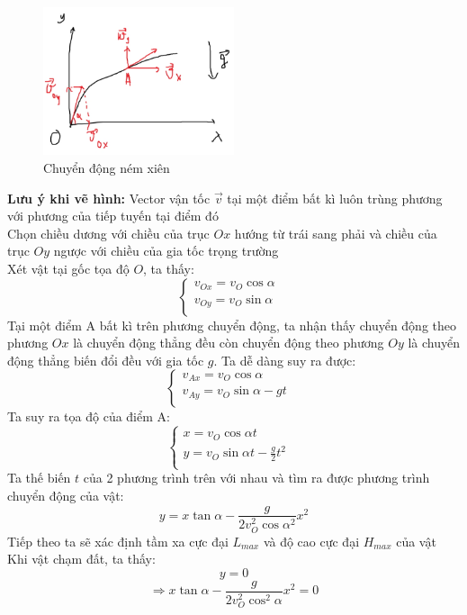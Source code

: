 \begin{figure}
    \centering
    \includegraphics[width=0.5\textwidth]{nem_xien.png}
    \caption{Chuyển động ném xiên}
    \label{nem_xien}
\end{figure}
\textbf{Lưu ý khi vẽ hình:} Vector vận tốc $\vec{v}$ tại một điểm bất kì luôn trùng phương với phương của tiếp tuyến tại điểm đó\\
Chọn chiều dương với chiều của trục $Ox$ hướng từ trái sang phải và chiều của trục $Oy$ ngược với chiều của gia tốc trọng trường\\
Xét vật tại gốc tọa độ $O$, ta thấy:
$$\left\{\begin{array}{ll}
    v_{Ox}=v_{O}\cos{\alpha}&\\
    v_{Oy}=v_{O}\sin{\alpha}&\\
\end{array}\right.$$
Tại một điểm A bất kì trên phương chuyển động, ta nhận thấy chuyển động theo phương $Ox$ là chuyển động thẳng đều còn chuyển động theo phương $Oy$ là chuyển động thẳng biến đổi đều với gia tốc $g$. Ta dễ dàng suy ra được:
$$\left\{\begin{array}{ll}
    v_{Ax}=v_{O}\cos{\alpha}&\\
    v_{Ay}=v_{O}\sin{\alpha}-gt&\\
\end{array}\right.$$
Ta suy ra tọa độ của điểm A:
$$\left\{\begin{array}{ll}
    x=v_{O}\cos{\alpha}t&\\
    y=v_{O}\sin{\alpha}t-\frac{g}{2}t^2&\\
\end{array}\right.$$
Ta thế biến $t$ của 2 phương trình trên với nhau và tìm ra được phương trình chuyển động của vật:
\begin{equation}
    y=x\tan{\alpha}-\frac{g}{2v_{O}^2\cos{\alpha}^2}x^2
\end{equation}
Tiếp theo ta sẽ xác định tầm xa cực đại $L_{max}$ và độ cao cực đại $H_{max}$ của vật
Khi vật chạm đất, ta thấy:
$$y=0$$
$$\Rightarrow x\tan{\alpha}-\frac{g}{2v_{O}^2\cos^2{\alpha}}x^2=0$$
